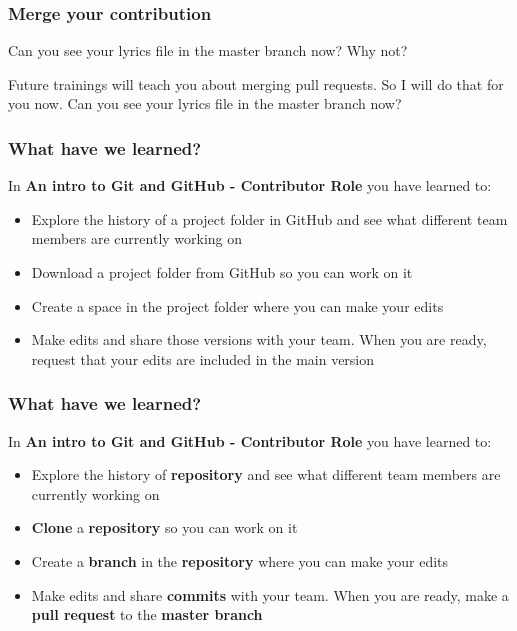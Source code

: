 \documentclass[aspectratio=169]{beamer} %
\begin{document}
\begin{frame}
\frametitle{Merge your contribution}

Can you see your lyrics file in the master branch now? Why not?

\vspace{.5cm}

Future trainings will teach you about merging pull requests. So I will do that for you now. Can you see your lyrics file in the master branch now?

\end{frame}



\begin{frame}
\frametitle{What have we learned?}

	In \textbf{An intro to Git and GitHub - Contributor Role} you have learned to:

	\begin{itemize}
		\item Explore the history of a project folder in GitHub and see what different team members are currently working on
		\item Download a project folder from GitHub so you can work on it
		\item Create a space in the project folder where you can make your edits
		\item Make edits and share those versions with your team. When you are ready, request that your edits are included in the main version
	\end{itemize}

\end{frame}

\begin{frame}
\frametitle{What have we learned?}

	In \textbf{An intro to Git and GitHub - Contributor Role} you have learned to:

	\begin{itemize}
		\item Explore the history of \textbf{repository} and see what different team members are currently working on
		\item \textbf{Clone} a \textbf{repository} so you can work on it
		\item Create a \textbf{branch} in the \textbf{repository} where you can make your edits
		\item Make edits and share \textbf{commits} with your team. When you are ready, make a \textbf{pull request} to the \textbf{master branch}
	\end{itemize}
\end{frame}
\end{document}
